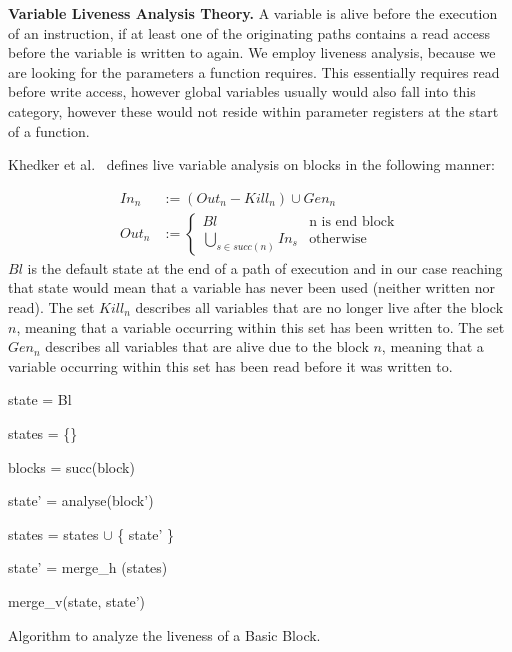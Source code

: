 \textbf{Variable Liveness Analysis Theory.}
\label{subsection:livenessanalysis}
A variable is alive before the execution of an instruction, if at least one of the originating paths contains a read access before the variable is written to again. We employ 
liveness analysis, because we are looking for the  parameters a function requires. This essentially requires read before write access, however global variables usually
would also fall into this category, however these would not reside within parameter registers at the start of a function.

Khedker et al.~ \cite{khedker2009data} defines live variable analysis on blocks in the following manner:

\begin{center}
\begin{subequations}
\label{eq:livenessbasedef}
\begin{align}
In_n &:= (Out_n - Kill_n) \cup Gen_n \label{eq:livenessbasedefIn} \\
Out_n &:= \left\{
  \begin{array}{lr}
    Bl & \text{n is end block}\\
    \underset{s \in succ(n)}{\bigcup} In_s & \text{otherwise}
  \end{array}
\right. \label{eq:livenessbasedefOut}
\end{align}
\end{subequations}
$Bl$ is the default state at the end of a path of execution and in our case reaching 
that state would mean that a variable has never been used (neither written nor read). 
The set $Kill_n$ describes all variables that are no longer live after the block $n$, 
meaning that a variable occurring within this set has been written to. The set $Gen_n$ 
describes all variables that are alive due to the block $n$, 
meaning that a variable occurring within this set has been read before it was written to.

\begin{algorithm}[!h]
	\SetAlgoLined
	{
 	state = Bl
 	

	states = \{\}
	
	blocks = succ(block)
	
	 {
	
 		state' = analyse(block')
 		
		states = states $\cup$ \{ state' \}
	}

	state' = merge\_h (states)

	\Return merge\_v(state, state')

	}
\caption{Algorithm to analyze the liveness of a Basic Block.}
\label{alg:liveness}
\end{algorithm}
\end{center}


